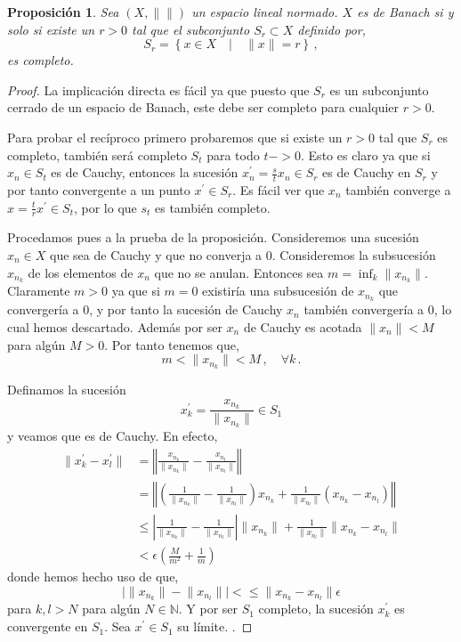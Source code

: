 \documentclass[12pt]{book}
\newtheorem{prop}{\bf Proposición}[chapter]
\def\NN{\mathbb{N}}
\newcommand{\abs}[1]{\lvert #1\rvert }
\newcommand{\norm}[1]{\lVert #1\rVert }
\begin{document}
\begin{prop} Sea $(X,\norm{})$ un espacio lineal normado. $X$ es de Banach si y solo si existe un 
$r>0$ tal que el subconjunto $S_r\subset X$ definido por,
 $$S_r=\left\{ x\in X\quad |\quad \norm{x} =r\right\}\,,$$
es completo.
\end{prop}
\begin{proof}
La implicación directa es fácil ya que puesto que $S_r$ es un subconjunto cerrado de un espacio 
de Banach, este  debe ser completo para cualquier $r>0$. 
 
 Para probar el recíproco  primero probaremos que si existe un $r>0$ tal que $S_r$ es 
completo, también será completo $S_t$ para todo $t->0$. Esto es claro ya que si $x_n\in S_t$ es 
de Cauchy, entonces la sucesión $x^\prime_n=\frac{s}{t}x_n\in S_r$ es de Cauchy en $S_r$ y por 
tanto convergente a un punto  $x^\prime\in S_r$. Es fácil ver que $x_n$ también converge a 
$x=\frac{t}{r}x^\prime  \in S_t$, por lo que $s_t$ es también completo.

 Procedamos pues a la prueba de la proposición. Consideremos una sucesión $x_n\in X$ 
que sea de Cauchy y que no converja a $0$. Consideremos la subsucesión  $x_{n_k}$ de los 
elementos de $x_n$ que no se anulan. Entonces sea $m=\inf_k \norm{x_{n_k}}$. Claramente 
$m>0$ ya que si $m=0$ existiría una subsucesión de $x_{n_k}$ que convergería a $0$, y por tanto 
la sucesión de Cauchy $x_n$ también convergería a $0$, lo cual hemos descartado. Además por 
ser $x_n$ de Cauchy es acotada $\norm{x_n}<M$ para algún $M>0$. Por tanto tenemos que,
 $$m<\norm{x_{n_k}}<M\,,\quad \forall k\,.$$

 
  Definamos la sucesión 
$$x_k^\prime =\frac{x_{n_k}}{\norm{x_{n_k}}}\in S_1$$
y veamos que es de Cauchy. En efecto,
\begin{align*}
\norm{x^\prime_k -x^\prime_l}&=\left\Vert \frac{x_{n_k}}{\norm{x_{n_k}}}  - \frac{x_{n_l}}{\norm{x_{n_l}}}\right\Vert\\
&=\left\Vert \left(\frac{1}{\norm{x_{n_k}}}-\frac{1}{\norm{x_{n_l}}}\right)x_{n_k}+\frac{1}{\norm{x_{n_l}}}(x_{n_k}-x_{n_l})\right\Vert\\
&\leq\left\vert\frac{1}{\norm{x_{n_k}}}-\frac{1}{\norm{x_{n_l}}}\right\vert  \norm{x_{n_k}}+\frac{1}{\norm{x_{n_l}}}\norm{x_{n_k}-x_{n_l}}\\
&<\epsilon \left(\frac{M}{m^2} + \frac{1}{m}\right)
\end{align*}
donde hemos hecho  uso de que,
$$\abs{\norm{x_{n_k}}-\norm{x_{n_l}}}<\leq \norm{x_{n_k} - x_{n_l}} \epsilon$$
para $k,l>N$ para algún $N\in \NN$. Y por ser $S_1$ completo, la sucesión $x^\prime_k$  es convergente en $S_1$. Sea $x^\prime\in S_1$  su límite.
.
 


\end{proof}
\end{document}

